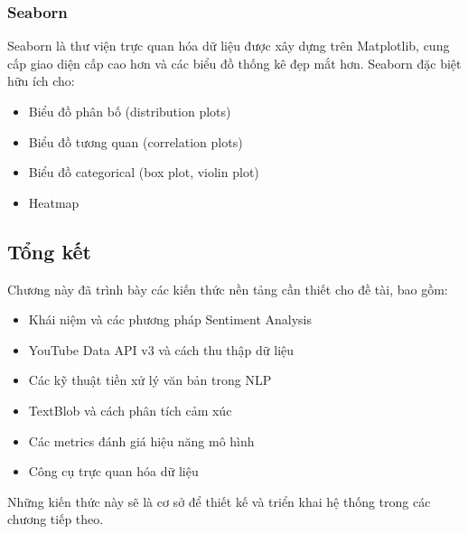 \subsubsection{Seaborn}
Seaborn là thư viện trực quan hóa dữ liệu được xây dựng trên Matplotlib, cung cấp giao diện cấp cao hơn và các biểu đồ thống kê đẹp mắt hơn. Seaborn đặc biệt hữu ích cho:
\begin{itemize}
    \item Biểu đồ phân bố (distribution plots)
    \item Biểu đồ tương quan (correlation plots)
    \item Biểu đồ categorical (box plot, violin plot)
    \item Heatmap
\end{itemize}

\subsection{Tổng kết}
Chương này đã trình bày các kiến thức nền tảng cần thiết cho đề tài, bao gồm:
\begin{itemize}
    \item Khái niệm và các phương pháp Sentiment Analysis
    \item YouTube Data API v3 và cách thu thập dữ liệu
    \item Các kỹ thuật tiền xử lý văn bản trong NLP
    \item TextBlob và cách phân tích cảm xúc
    \item Các metrics đánh giá hiệu năng mô hình
    \item Công cụ trực quan hóa dữ liệu
\end{itemize}

Những kiến thức này sẽ là cơ sở để thiết kế và triển khai hệ thống trong các chương tiếp theo.
